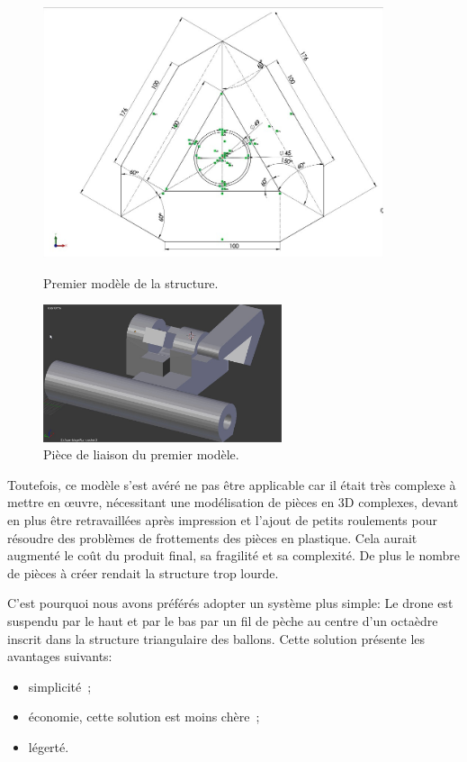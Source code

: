 \documentclass[a4paper,11pt]{article}
\begin{document}
\begin{figure}[H]
 \centering
 \includegraphics[width=10cm]{../Images/structure0_0.jpg}
 \caption{Premier modèle de la structure.}
 \includegraphics[width=7cm]{../Images/fixation.jpg}
 \caption{Pièce de liaison du premier modèle.}
\end{figure}


Toutefois, ce modèle s'est avéré ne pas être applicable car il était très complexe à mettre en œuvre, nécessitant une modélisation de pièces en 3D complexes, devant en plus être retravaillées après impression et l'ajout de petits roulements pour résoudre des problèmes de frottements des pièces en plastique. Cela aurait augmenté le coût du produit final, sa fragilité et sa complexité. De plus le nombre de pièces à créer rendait la structure trop lourde.

C'est pourquoi nous avons préférés adopter un système plus simple:
Le drone est suspendu par le haut et par le bas par un fil de pèche au centre d'un octaèdre inscrit dans la structure triangulaire des ballons. Cette solution présente les avantages suivants:
\begin{itemize}
	\item simplicité~;
	\item économie, cette solution est moins chère~;
	\item légerté.
\end{itemize}
\end{document}

